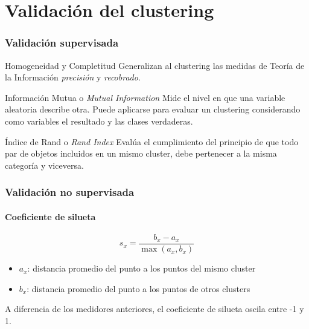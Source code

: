 \section{Validación del clustering}\label{sec:validation}

\begin{frame}
    \frametitle{Validación supervisada}

    \pause
    \begin{block}{Homogeneidad y Completitud}
        Generalizan al clustering las medidas de Teoría de la Información \textit{precisión} y \textit{recobrado}.
    \end{block}

    \pause
    \begin{block}{Información Mutua o \textit{Mutual Information}}
        Mide el nivel en que una variable aleatoria describe otra.
        Puede aplicarse para evaluar un clustering considerando como variables el resultado y las clases verdaderas.
    \end{block}

    \pause
    \begin{block}{Índice de Rand o \textit{Rand Index}}
        Evalúa el cumplimiento del principio de que todo par de objetos incluidos en un mismo cluster, debe pertenecer a la misma categoría y viceversa.
    \end{block}

\end{frame}

\begin{frame}
    \frametitle{Validación no supervisada}
    \framesubtitle{Coeficiente de silueta}

    \pause
    \begin{equation*}
        s_x = \frac{b_x - a_x}{\max{(a_x, b_x)}}
    \end{equation*}

    \pause
    \begin{itemize}
        \item $a_x$: distancia promedio del punto a los puntos del mismo cluster
        \item $b_x$: distancia promedio del punto a los puntos de otros clusters
    \end{itemize}

    \pause
    A diferencia de los medidores anteriores, el coeficiente de silueta oscila entre -1 y 1.

\end{frame}